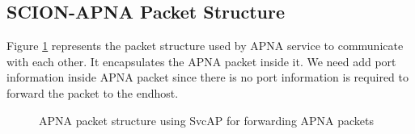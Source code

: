 \subsection{SCION-APNA Packet Structure}
Figure \ref{fig:apna_svc_pkt} represents the packet structure used by APNA service to communicate with each other. It encapsulates the APNA packet inside it. We need add port information inside APNA packet since there is no port information is required to forward the packet to the endhost.
\begin{figure}[th!!]
\centering
\noindent
{}
\decoRule
\caption[APNA packet structure using SvcAP]{APNA packet structure  using SvcAP for forwarding APNA packets}
\label{fig:apna_svc_pkt}
\end{figure}


